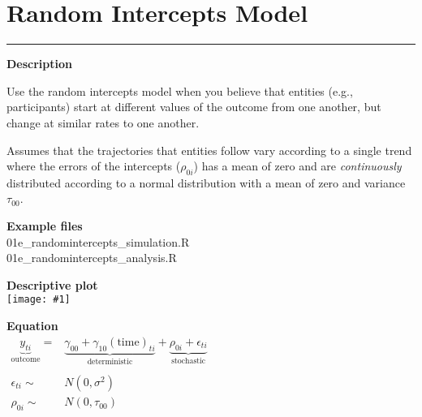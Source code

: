 \documentclass[10pt, landscape, article]{memoir}
\newcommand{\outcome}[1]{\underbrace{#1}_{\text{outcome}}}
\newcommand{\deterministic}[1]{\underbrace{#1}_{\text{deterministic}}}
\newcommand{\stochastic}[1]{\underbrace{#1}_{\text{stochastic}}}
\newenvironment{desc}{
    \begin{minipage}[t][.6\textheight][t]{.9\textwidth}
    \setlength{\parskip}{.5\baselineskip}
    \textbf{\large Description}\\\raggedright
}{
    \end{minipage}
}
\newenvironment{eqn}{
    \begin{minipage}[t][.39\textheight][t]{\textwidth}
    \textbf{\large Equation}\\
}{
    \end{minipage}
}
\newcommand{\datafig}[1]{
    \begin{minipage}[t][.6\textheight][t]{\textwidth}%
    \textbf{\large Descriptive plot}\\
    \texttt{[image: \#1]}%
    \end{minipage}
}
\newenvironment{files}{
    \begin{minipage}[t][.2\textheight][t]{\textwidth}
    \textbf{\large Example files}\\
}{
    \end{minipage}
}
\begin{document}
\chapter{Random Intercepts Model}
\label{intercepts}
\rule[\baselineskip]{\textwidth}{3pt}
\begin{minipage}[t][.9\textheight][t]{.4\textwidth}
\begin{desc}
Use the random intercepts model when you believe that entities (e.g., participants) start at different values of the outcome from one another, but change at similar rates to one another. 

Assumes that the trajectories that entities follow vary according to a single trend where the errors of the intercepts ($\rho_{0i}$) has a mean of zero and are \emph{continuously} distributed according to a normal distribution with a mean of zero and variance $\tau_{00}$.
\end{desc}
\begin{files}
01e\_randomintercepts\_simulation.R\\01e\_randomintercepts\_analysis.R
\end{files}
\end{minipage} %
\begin{minipage}[t][.9\textheight][t]{.6\textwidth}
\datafig{random_intercepts.pdf}
\begin{eqn}
$\begin{array}{rl}
\outcome{y_{ti}} = & 
\deterministic{\gamma_{00} + \gamma_{10}(\text{time})_{ti}} + 
\stochastic{\rho_{0i} + \epsilon_{ti}} \\
&\\
\epsilon_{ti} \sim & N(0, \sigma^2) \\
\rho_{0i} \sim & N(0, \tau_{00})
\end{array}$
\end{eqn}
\end{minipage}

\end{document}
